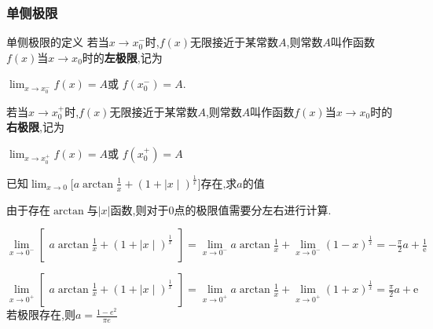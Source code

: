 \documentclass[12pt, a4paper, oneside, UTF8]{ctexbook}  %
\begin{document}
\begin{sloppypar}
    \subsubsection{单侧极限}
    \begin{defn}{单侧极限的定义}{}
        若当$x\to x_0^{-}$时,$f(x)$无限接近于某常数$A$,则常数$A$叫作函数$f(x)$当$x\to x_0$时的\textbf{左极限},记为
        \begin{center}
            $\operatorname*{lim}_{x\to x_0^{-}}f(x)=A$或 $f(x_0^{-})=A$.
        \end{center}
        若当$x\to x_0^+$时,$f(x)$无限接近于某常数$A$,则常数$A$叫作函数$f(x)$当$x\to x_0$时的\textbf{右极限},记为
        \begin{center}
            $\operatorname*{lim}_{x\to x_0^{+}}f(x)=A$或 $f(x_0^{+})=A$
        \end{center}
    \end{defn}
    \begin{problem}
    $\text{已知}\lim_{x\to0}\biggl[a\arctan\frac{1}{x}+(1+\mid x\mid)^{\frac{1}{x}}\biggr]\text{存在,求}a\text{的值}$
    \end{problem}
    \begin{solution}
        由于存在$\arctan$与$|x|$函数,则对于0点的极限值需要分左右进行计算.

        $\lim\limits_{x\to0^{-}}\left[\begin{matrix}a\arctan\frac{1}{x}+(1+\mid x\mid)^{\frac{1}{x}}\\\end{matrix}\right]=\lim\limits_{x\to0^{-}}a\arctan\frac{1}{x}+\lim\limits_{x\to0^{-}}(1-x)^{\frac{1}{x}}=-\frac{\pi}{2}a+\frac{1}{\text{e}}$

        $\lim\limits_{x\to0^+}\left[\begin{matrix}a\arctan\frac{1}{x}+(1+\mid x\mid)^{\frac{1}{x}}\\\end{matrix}\right]=\lim\limits_{x\to0^+}a\arctan\frac{1}{x}+\lim\limits_{x\to0^+}(1+x)^{\frac{1}{x}}=\frac{\pi}{2}a+\mathrm{e}$
        若极限存在,则$a=\frac{1-e^2}{\pi e}$
    \end{solution}

\end{sloppypar}
\end{document}

